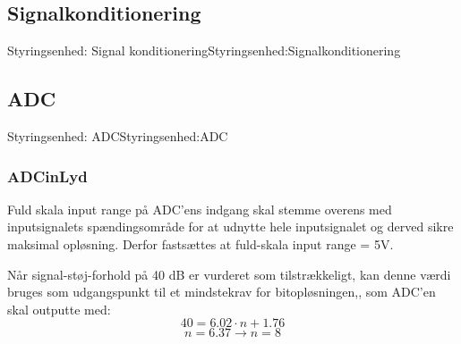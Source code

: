 {\subsection{Signalkonditionering}

\begin{PartBlokDescription}{Styringsenhed: Signal konditionering}{Styringsenhed:Signalkonditionering}
\end{PartBlokDescription}

\subsection{ADC}

\begin{PartBlokDescription}{Styringsenhed: ADC}{Styringsenhed:ADC}
\end{PartBlokDescription}

\subsubsection{ADCinLyd}
Fuld skala input range på ADC'ens indgang skal stemme overens med inputsignalets spændingsområde for at udnytte hele inputsignalet og derved sikre maksimal opløsning. 
Derfor fastsættes at fuld-skala input range = 5V.

Når signal-støj-forhold på 40 dB er vurderet som tilstrækkeligt, kan denne værdi bruges som udgangspunkt til et mindstekrav for bitopløsningen,\cite{KesterMT-001Care}, som ADC'en skal outputte med:
\[ 40 = 6.02 \cdot n+1.76 \]
\[ n = 6.37 \to n = 8 \]

}
